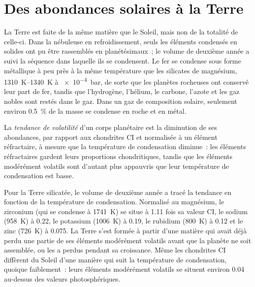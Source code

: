 \section{Des abondances solaires à la Terre}\label{sec:b3:origin-of-elements:earth}

La Terre est faite de la même matière que le Soleil, mais non de la totalité
de celle-ci. Dans la nébuleuse en refroidissement, seuls les éléments condensés en solides
ont pu être rassemblés en planétésimaux~; le volume de deuxième année a suivi la
séquence dans laquelle ils se condensent. Le fer se condense sous forme métallique à peu près à la
même température que les silicates de magnésium, \qtyrange{1310}{1340}{K} à
\qty{e-4}{bar}, de sorte que les planètes rocheuses ont conservé leur part de fer, tandis que
l'hydrogène, l'hélium, le carbone, l'azote et les gaz nobles sont restés dans le gaz.
Dans un gaz de composition solaire, seulement environ \qty{0.5}{\percent} de la masse
se condense en roche et en métal.

\begin{definition}\label{def:b3:origin-of-elements:volatility}
La \emph{tendance de volatilité} d'un corps planétaire
est la diminution de ses abondances, par rapport aux chondrites CI et normalisée à
un élément réfractaire, à mesure que la température de condensation diminue~: les
éléments réfractaires gardent leurs proportions chondritiques, tandis que les
éléments modérément volatils sont d'autant plus appauvris que leur température
de condensation est basse.
\end{definition}

Pour la Terre silicatée, le volume de deuxième année a tracé la tendance en fonction de la
température de condensation. Normalisé au magnésium, le zirconium
(qui se condense à \qty{1741}{K}) se situe à \num{1.11} fois sa valeur CI, le sodium
(\qty{958}{K}) à \num{0.22}, le potassium
(\qty{1006}{K}) à \num{0.19}, le rubidium (\qty{800}{K}) à \num{0.12}
et le zinc (\qty{726}{K}) à \num{0.075}. La Terre s'est formée à partir d'une matière
qui avait déjà perdu une partie de ses éléments modérément volatils avant que la
planète ne soit assemblée, ou les a perdus pendant sa croissance. Même les chondrites CI
diffèrent du Soleil d'une manière qui suit la température de condensation, quoique
faiblement~: leurs éléments modérément volatils se situent
environ \num{0.04}~ au-dessus des valeurs photosphériques.

